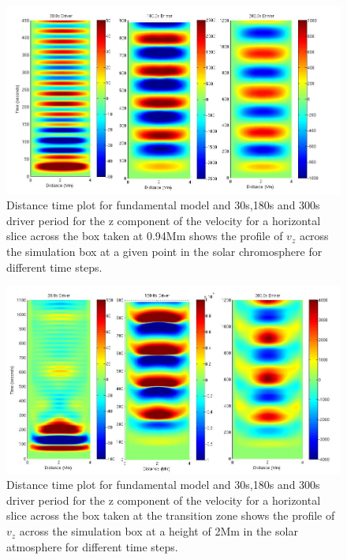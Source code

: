 \documentclass[final,1p]{elsarticle}
\begin{document}
\begin{figure}[h]\label{fig5_dt_30_180_300_0_horiz_p94Mm}
\includegraphics[scale=0.5]{images/fig5_dt_30_180_300_0_horiz_p94Mm.jpg}
\caption{Distance time plot for fundamental model and 30s,180s and 300s driver period for the z component of the velocity for a horizontal slice across the box  taken at 0.94Mm shows  the profile of $ v_{z}$ across the simulation box at a given point in the solar chromosphere for different time steps. }
\end{figure}


\begin{figure}[h]\label{fig6_dt_30_180_300_0_horiz_2Mm}
\includegraphics[scale=0.5]{images/fig6_dt_30_180_300_0_horiz_2Mm.jpg}
\caption{Distance time plot for fundamental model and 30s,180s and 300s driver period for the z component of the velocity for a horizontal slice across the box  taken at the transition zone shows  the profile of $v_{z}$ across the simulation box at a height of 2Mm in the solar atmosphere for different time steps. }
\end{figure}
\end{document}
